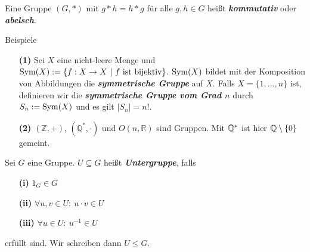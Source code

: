 \begin{df}
Eine Gruppe $(G,\ast) $ mit $g \ast h = h \ast g$ für alle $g,h \in G$
heißt \textbf{\textit{kommutativ}} oder \textbf{\textit{abelsch}}.
\end{df}

\begin{genericdf}{Beispiele}\label{1.3}\ 
\begin{enumerate}
\item[\textbf{(1)}]
Sei $X$ eine nicht-leere Menge und $\operatorname{Sym}(X) := \lbrace f : X \to X \ | \ f \ \text{ist bijektiv} \rbrace$.
$\operatorname{Sym}(X)$ bildet mit der Komposition von Abbildungen die \textbf{\textit{symmetrische Gruppe}} auf $X$.
Falls $X = \lbrace 1,...,n \rbrace$ ist, definieren wir die \textbf{\textit{symmetrische Gruppe vom Grad $n$}} durch
$S_n := \operatorname{Sym}(X)$ und es gilt $|S_n| = n!$.
\item[\textbf{(2)}]
$(\mathbb{Z},+)$, $(\mathbb{Q}^\ast,\cdot)$ und $O(n,\mathbb{R})$ sind Gruppen. Mit $\mathbb{Q}^\ast$ ist hier $\mathbb{Q} \setminus \lbrace 0 \rbrace$ gemeint.
\end{enumerate}
\end{genericdf}

\begin{df}\label{1.4}
Sei $G$ eine Gruppe.
$U \subseteq G$ heißt \textbf{\textit{Untergruppe}}, falls
\begin{enumerate}
\item[\textbf{(i)}]
$1_G \in G$ 
\item[\textbf{(ii)}]
$\forall u,v \in U : \ u \cdot v \in U$
\item[\textbf{(iii)}]
$\forall u \in U: \ u^{-1} \in U $
\end{enumerate}
erfüllt sind.
Wir schreiben dann $U \leq G$.
\end{df}

